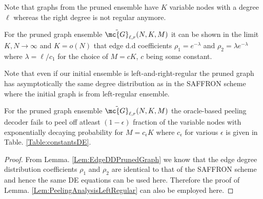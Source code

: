 \documentclass[conference,twocolumn]{IEEEtran}
\def\ceps{c_{\epsilon}}
\begin{document}
Note that graphs from the pruned ensemble have $K$ variable nodes with a degree $\ell$ whereas the right degree is not regular anymore. 

\begin{lemma}
\label{Lem:EdgeDDPrunedGraph}
For the pruned graph ensemble $\tilde{\mc{G}}_{\ell,r}(N,K,M)$ it can be shown in the limit $K,N\rightarrow\infty$ and $K=o(N)$ that edge d.d coefficients $\rho_{1}=e^{-\lambda}$ and $\rho_{2}=\lambda e^{-\lambda}$ where $\lambda=\ell/c_1$ for the choice of $M=cK$, $c$ being some constant.
\end{lemma}

Note that even if our initial ensemble is left-and-right-regular the pruned graph has asymptotically the same degree distribution as in the SAFFRON scheme where the initial graph is from left-regular ensemble.

\begin{lemma}
\label{Lem:PeelingRegularAnalysis}
For the pruned graph ensemble $\tilde{\mc{G}}_{\ell,r}(N, K,M)$ the oracle-based peeling decoder fails to peel off atleast $(1-\epsilon)$ fraction of the variable nodes with exponentially decaying probability for $M=\ceps K$ where $\ceps$ for various $\epsilon$ is given in Table. \ref{Table:constantsDE}.
\end{lemma}
\begin{proof}
From Lemma. \ref{Lem:EdgeDDPrunedGraph} we know that the edge degree distribution coefficients $\rho_1$ and $\rho_2$ are identical to that of the SAFFRON scheme and hence the same DE equations can be used here. Therefore the proof of Lemma. \ref{Lem:PeelingAnalysisLeftRegular} can also be employed here.
\end{proof}
\end{document}
